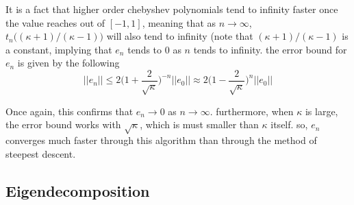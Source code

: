   It is a fact that higher order chebyshev polynomials tend to infinity faster once the value reaches out of $[-1, 1]$, meaning that as $n \rightarrow \infty$, $t_n\big( (\kappa+1)/(\kappa-1)\big)$ will also tend to infinity (note that $(\kappa+1)/(\kappa-1)$ is a constant, implying that $e_n$ tends to $0$ as $n$ tends to infinity. the error bound for $e_n$ is given by the following 
  \begin{equation}
    ||e_n|| \leq 2 \bigg( 1 + \frac{2}{\sqrt{\kappa}} \bigg)^{-n} ||e_0|| \approx 2 \bigg( 1 - \frac{2}{\sqrt{\kappa}} \bigg)^{n} ||e_0||
  \end{equation}

  Once again, this confirms that $e_n \rightarrow 0$ as $n \rightarrow \infty$. furthermore, when $\kappa$ is large, the error bound works with $\sqrt{\kappa}$, which is must smaller than $\kappa$ itself. so, $e_n$ converges much faster through this algorithm than through the method of steepest descent. 

\subsection{Eigendecomposition}
